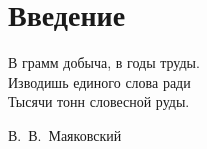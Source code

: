 \chapter*{Введение}							%
\epigraph{В грамм добыча, в годы труды.\\
Изводишь единого слова ради\\
Тысячи тонн словесной руды.}{В.~В.~Маяковский} 

\clearpage